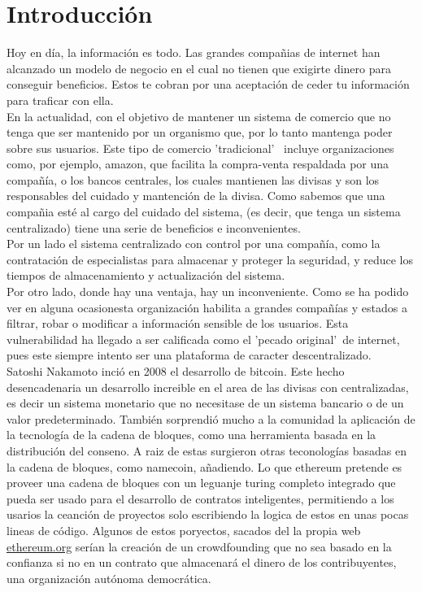 \documentclass[11pt,a4paper]{article}
\begin{document}
\section{Introducción}
Hoy en día, la información es todo. Las grandes compañias de internet han alcanzado un modelo  de negocio en el cual no tienen que exigirte dinero para conseguir beneficios. Estos te cobran por una aceptación de ceder tu información para traficar con ella. \\

En la actualidad, con el objetivo de mantener un sistema de comercio que no tenga que ser mantenido por un organismo que, por lo tanto mantenga poder sobre sus usuarios. Este tipo de comercio 'tradicional' \ incluye organizaciones como, por ejemplo, amazon, que facilita la compra-venta respaldada por una compañía, o los bancos centrales, los cuales mantienen las divisas y son los responsables del cuidado y mantención de la divisa. Como sabemos que una compañia esté al cargo del cuidado del sistema, (es decir, que tenga un sistema centralizado) tiene una serie de beneficios e inconvenientes. \\

Por un lado el sistema centralizado con control por una compañía, como la contratación de especialistas para almacenar y proteger la seguridad, y reduce los tiempos de almacenamiento y actualización del sistema. \\

Por otro lado, donde hay una ventaja, hay un inconveniente. Como se ha podido ver en alguna ocasion\footnotemark esta organización habilita a grandes compañías y estados a filtrar, robar o modificar a información sensible  de los usuarios. Esta vulnerabilidad ha llegado a ser calificada como el 'pecado original'\ de internet, pues este siempre intento ser una plataforma de caracter descentralizado.\\

Satoshi Nakamoto inció en 2008 el desarrollo de bitcoin. Este hecho desencadenaria un desarrollo increible en el area de las divisas con centralizadas, es decir un sistema monetario que no necesitase de un sistema bancario o de un valor predeterminado. También sorprendió mucho a la comunidad la aplicación de la tecnología de la cadena de bloques, como una herramienta basada en la distribución del conseno. A raiz de estas surgieron otras teconologías basadas en la cadena de bloques, como namecoin, añadiendo. Lo que ethereum pretende es proveer una cadena de bloques con un leguanje turing completo integrado que pueda ser usado para el desarrollo de contratos inteligentes, permitiendo a los usarios la ceanción de proyectos solo escribiendo la logica de estos en unas pocas lineas de código. Algunos de estos poryectos, sacados del la propia web \url{ethereum.org} serían la creación de un crowdfounding que no sea basado en la confianza si no en un contrato que almacenará el dinero de los contribuyentes, una organización autónoma democrática.\\
\end{document}
